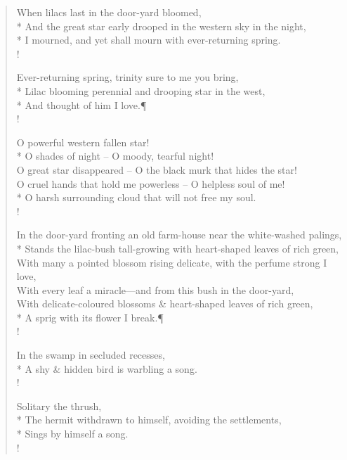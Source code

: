 \documentclass[MAIN]{subfiles}
\begin{document}
\settowidth{\versewidth}{While glow the heavens with the last steps of day,}
\begin{verse}
When lilacs last in the door-yard bloomed,\\*
And the great star early drooped in the western sky in the night,\\*
I mourned, and yet shall mourn with ever-returning spring.\\!

Ever-returning spring, trinity sure to me you bring,\\*
Lilac blooming perennial and drooping star in the west,\\*
And thought of him I love.\P\\!

O powerful western fallen star!\\*
O shades of night -- O moody, tearful night!\\
O great star disappeared -- O the black murk that hides the star!\\
O cruel hands that hold me powerless -- O helpless soul of me!\\*
O harsh surrounding cloud that will not free my soul.\\!

In the door-yard fronting an old farm-house near the white-washed palings,\\*
Stands the lilac-bush tall-growing with heart-shaped leaves of rich green,\\
With many a pointed blossom rising delicate, with the perfume strong I love,\\
With every leaf a miracle—and from this bush in the door-yard,\\
With delicate-coloured blossoms \& heart-shaped leaves of rich green,\\*
A sprig with its flower I break.\P\\!

In the swamp in secluded recesses,\\*
A shy \& hidden bird is warbling a song.\\!

Solitary the thrush,\\*
The hermit withdrawn to himself, avoiding the settlements,\\*
Sings by himself a song.\\!


\end{verse}
\end{document}
